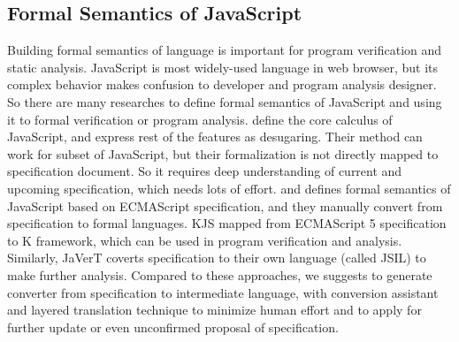 
\subsection{Formal Semantics of JavaScript}
Building formal semantics of language is important for program verification and static analysis. JavaScript is most widely-used language in
web browser, but its complex behavior makes confusion to developer and program analysis designer. So there are many researches to define formal semantics of JavaScript and
using it to formal verification or program analysis. \cite{lambdajs} define the core calculus of JavaScript, and express rest of the features as desugaring. Their method can
work for subset of JavaScript, but their formalization is not directly mapped to specification document. So it requires deep understanding of current and upcoming specification,
which needs lots of effort. \cite{kjs} and \cite{javert} defines formal semantics of JavaScript based on ECMAScript specification, and they manually convert from specification
to formal languages. KJS mapped from ECMAScript 5 specification to K framework, which can be used in program verification and analysis. Similarly, JaVerT coverts specification
to their own language (called JSIL) to make further analysis. Compared to these approaches, we suggests to generate converter from specification to intermediate language, with
conversion assistant and layered translation technique to minimize human effort and to apply for further update or even unconfirmed proposal of specification.

